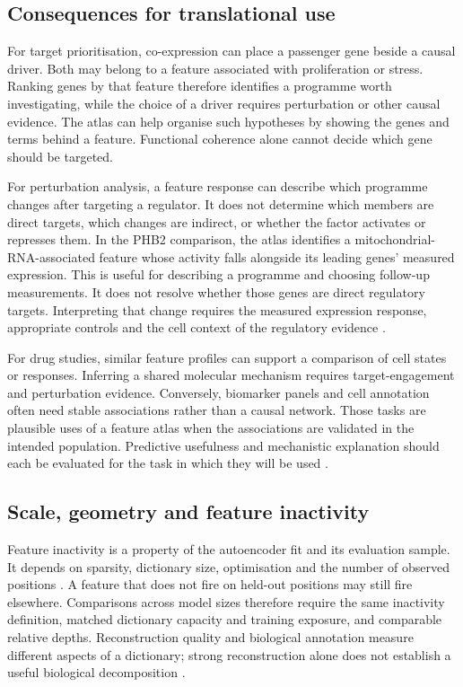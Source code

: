 \documentclass[review,authoryear,12pt]{elsarticle}
\begin{document}
\subsection{Consequences for translational use}

For target prioritisation, co-expression can place a passenger gene beside a causal driver. Both may
belong to a feature associated with proliferation or stress. Ranking genes by that feature therefore
identifies a programme worth investigating, while the choice of a driver requires perturbation or
other causal evidence. The atlas can help organise such hypotheses by showing the genes and terms
behind a feature. Functional coherence alone cannot decide which gene should be targeted.

For perturbation analysis, a feature response can describe which programme changes after targeting a
regulator. It does not determine which members are direct targets, which changes are indirect, or
whether the factor activates or represses them. In the PHB2 comparison, the atlas identifies a
mitochondrial-RNA-associated feature whose activity falls alongside its leading genes' measured
expression. This is useful for describing a programme and choosing follow-up measurements. It does
not resolve whether those genes are direct regulatory targets. Interpreting that change requires
the measured expression response, appropriate controls and the cell context of the regulatory
evidence \citep{ref24,refPerturbBaselines}.

For drug studies, similar feature profiles can support a comparison of cell states or responses.
Inferring a shared molecular mechanism requires target-engagement and perturbation evidence.
Conversely, biomarker panels and cell annotation often need stable associations rather than a causal
network. Those tasks are plausible uses of a feature atlas when the associations are validated in
the intended population. Predictive usefulness and mechanistic explanation should each be evaluated
for the task in which they will be used \citep{ref3,ref4}.

\subsection{Scale, geometry and feature inactivity}

Feature inactivity is a property of the autoencoder fit and its evaluation sample. It depends on
sparsity, dictionary size, optimisation and the number of observed positions \citep{ref20}.
A feature that does not fire on held-out positions may still fire elsewhere. Comparisons across
model sizes therefore require the same inactivity definition, matched dictionary capacity and
training exposure, and comparable relative depths. Reconstruction quality and biological annotation
measure different aspects of a dictionary; strong reconstruction alone does not establish a useful
biological decomposition \citep{refRandomTransformerSAE,refRandomSAEBaselines}.
\end{document}
